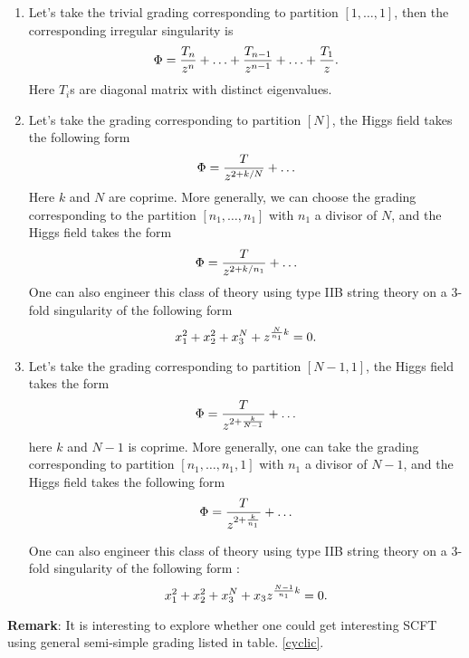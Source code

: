 \documentclass[a4paper,11pt]{article}
\begin{document}
\begin{enumerate}
\item Let's take the trivial grading corresponding to partition {$[1,\ldots, 1]$},  
then the corresponding irregular singularity is 
\begin{equation}
\Phi={T_n\over z^n}+\ldots +{T_{n-1}\over z^{n-1}}+\ldots+{T_{1}\over z}.
\label{trivial}
\end{equation} 
Here $T_i$s are diagonal matrix with distinct eigenvalues.
\item Let's take the grading corresponding to partition $[N]$, the Higgs field takes the following form
\begin{equation}
\Phi={T\over z^{2+k/N}}+\ldots
\end{equation}
Here  $k$ and $N$ are coprime.  More generally, we can choose the grading corresponding to the partition $[n_1,\ldots, n_1]$ with $n_1$ a divisor of $N$, and the Higgs field takes the form
\begin{equation}
\Phi={T\over z^{2+k/n_1}}+\ldots
\end{equation}
One can also engineer this class of theory using 
type IIB string theory on a 3-fold singularity of the following form \cite{Cecotti:2010fi, Xie:2012hs}
\begin{equation}
x_1^2+x_2^2+x_3^N+z^{{N\over n_1}k}=0.
\end{equation}



\item  Let's take the grading corresponding to partition $[N-1,1]$, the Higgs field  takes the form 
\begin{equation}
\Phi={T\over z^{2+{k\over N-1}}}+\ldots
\end{equation}
here $k$ and $N-1$ is coprime. More generally, one can take the grading corresponding to  partition $[n_1,\ldots, n_1, 1]$ with $n_1$ a divisor of $N-1$, and the Higgs field takes the following form
\begin{equation}
\Phi={T\over z^{2+{k\over n_1}}}+\ldots
\end{equation}

One can also engineer this class of theory using 
type IIB string theory on a 3-fold singularity of the following form \cite{Xie:2012hs}:
\begin{equation}
x_1^2+x_2^2+x_3^N+x_3z^{{N-1\over n_1}k}=0.
\end{equation}
\end{enumerate}

\textbf{Remark}: It is interesting to explore whether one could get interesting SCFT using general semi-simple grading listed in table. \ref{cyclic}. 
\end{document}
